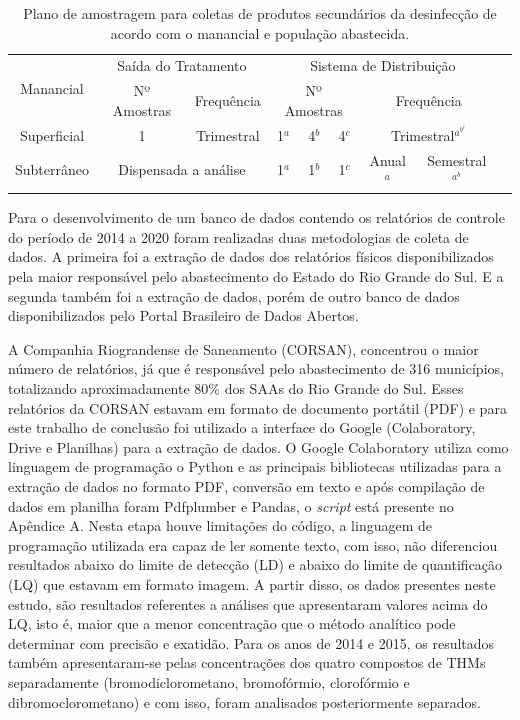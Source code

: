\begin{table}[!htb]

\small
\centering
\caption{Plano de amostragem para coletas de produtos secundários da desinfecção de acordo com o manancial e população abastecida.} 
\begin{tabular}{cccccccccl}
\toprule
 \multirow{2}{*}{Manancial} & \multicolumn{2}{c}{Saída do Tratamento} & \multicolumn{6}{c}{Sistema de Distribuição} \\
  & Nº Amostras & Frequência & \multicolumn{3}{c}{Nº Amostras} & \multicolumn{3}{c}{Frequência} \\\midrule
 Superficial & 1 & Trimestral & 1$^a$ & 4$^b$ & 4$^c$ & \multicolumn{3}{c}{Trimestral$^a^b^c$} \\
Subterrâneo & \multicolumn{2}{c}{Dispensada a análise} & 1$^a$ & 1$^b$ & 1$^c$ & Anual$^a$ & \multicolumn{2}{c}{Semestral$^a^b$} \\

\bottomrule
\end{tabular}

\end{table}


Para o desenvolvimento de um banco de dados contendo os relatórios de controle do período de 2014 a 2020 foram realizadas duas metodologias de coleta de dados. A primeira foi a extração de dados dos relatórios físicos disponibilizados pela maior responsável pelo abastecimento do Estado do Rio Grande do Sul. E a segunda também foi a extração de dados, porém de outro banco de dados disponibilizados pelo Portal Brasileiro de Dados Abertos.

A Companhia Riograndense de Saneamento (CORSAN), concentrou o maior número de relatórios, já que é responsável pelo abastecimento de 316 municípios, totalizando aproximadamente 80\% dos SAAs do Rio Grande do Sul. Esses relatórios da CORSAN estavam em formato de documento portátil (PDF) e para este trabalho de conclusão foi utilizado a interface do Google (Colaboratory, Drive e Planilhas) para a extração de dados. O Google Colaboratory utiliza como linguagem de programação o Python e as principais bibliotecas utilizadas para a extração de dados no formato PDF, conversão em texto e após compilação de dados em planilha foram Pdfplumber e Pandas, o \textit{script} está presente no Apêndice A. Nesta etapa houve limitações do código, a linguagem de programação utilizada era capaz de ler somente texto, com isso, não diferenciou resultados abaixo do limite de detecção (LD) e abaixo do limite de quantificação (LQ) que estavam em formato imagem. A partir disso, os dados presentes neste estudo, são resultados referentes a análises que apresentaram valores acima do LQ, isto é, maior que a menor concentração que o método analítico pode determinar com precisão e exatidão. Para os anos de 2014 e 2015, os resultados também apresentaram-se pelas concentrações dos quatro compostos de THMs separadamente (bromodiclorometano, bromofórmio, clorofórmio e dibromoclorometano) e com isso, foram analisados posteriormente separados.


